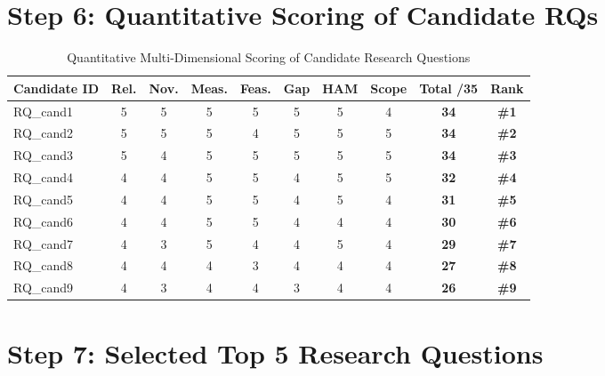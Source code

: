 \documentclass[11pt,a4paper]{article}
\begin{document}
\section{Step 6: Quantitative Scoring of Candidate RQs}
\begin{table}[htbp]
\centering
\small
\begin{tabular}{l ccccccc c c}
\toprule
\textbf{Candidate ID} & \textbf{Rel.} & \textbf{Nov.} & \textbf{Meas.} & \textbf{Feas.} & \textbf{Gap} & \textbf{HAM} & \textbf{Scope} & \textbf{Total /35} & \textbf{Rank} \\
\midrule
RQ\_cand1 & 5 & 5 & 5 & 5 & 5 & 5 & 4 & \textbf{34} & \textbf{\#1} \\
RQ\_cand2 & 5 & 5 & 5 & 4 & 5 & 5 & 5 & \textbf{34} & \textbf{\#2} \\
RQ\_cand3 & 5 & 4 & 5 & 5 & 5 & 5 & 5 & \textbf{34} & \textbf{\#3} \\
RQ\_cand4 & 4 & 4 & 5 & 5 & 4 & 5 & 5 & \textbf{32} & \textbf{\#4} \\
RQ\_cand5 & 4 & 4 & 5 & 5 & 4 & 5 & 4 & \textbf{31} & \textbf{\#5} \\
RQ\_cand6 & 4 & 4 & 5 & 5 & 4 & 4 & 4 & \textbf{30} & \textbf{\#6} \\
RQ\_cand7 & 4 & 3 & 5 & 4 & 4 & 5 & 4 & \textbf{29} & \textbf{\#7} \\
RQ\_cand8 & 4 & 4 & 4 & 3 & 4 & 4 & 4 & \textbf{27} & \textbf{\#8} \\
RQ\_cand9 & 4 & 3 & 4 & 4 & 3 & 4 & 4 & \textbf{26} & \textbf{\#9} \\

\bottomrule
\end{tabular}
\caption{Quantitative Multi-Dimensional Scoring of Candidate Research Questions}
\label{tab:scoring}
\end{table}

\section{Step 7: Selected Top 5 Research Questions}
\end{document}
